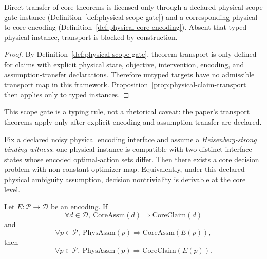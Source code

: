 \begin{proposition}\label{prop:typed-physical-transport-requirement}
Direct transfer of core theorems is licensed only through a declared physical scope gate instance (Definition~\ref{def:physical-scope-gate}) and a corresponding physical-to-core encoding (Definition~\ref{def:physical-core-encoding}). Absent that typed physical instance, transport is blocked by construction.
\end{proposition}

\begin{proof}
By Definition~\ref{def:physical-scope-gate}, theorem transport is only defined for claims with explicit physical state, objective, intervention, encoding, and assumption-transfer declarations. Therefore untyped targets have no admissible transport map in this framework. Proposition~\ref{prop:physical-claim-transport} then applies only to typed instances.
\end{proof}

This scope gate is a typing rule, not a rhetorical caveat: the paper's transport theorems apply only after explicit encoding and assumption transfer are declared.

\begin{proposition}\label{prop:heisenberg-strong-nontrivial-opt}
Fix a declared noisy physical encoding interface and assume a \emph{Heisenberg-strong binding witness}: one physical instance is compatible with two distinct interface states whose encoded optimal-action sets differ.
Then there exists a core decision problem with non-constant optimizer map.
Equivalently, under this declared physical ambiguity assumption, decision nontriviality is derivable at the core level.
\end{proposition}

\begin{proposition}\label{prop:physical-claim-transport}
Let $E:\mathcal{P}\to\mathcal{D}$ be an encoding. If
\[
\forall d\in\mathcal{D},\ \mathrm{CoreAssm}(d)\Rightarrow \mathrm{CoreClaim}(d)
\]
and
\[
\forall p\in\mathcal{P},\ \mathrm{PhysAssm}(p)\Rightarrow \mathrm{CoreAssm}(E(p)),
\]
then
\[
\forall p\in\mathcal{P},\ \mathrm{PhysAssm}(p)\Rightarrow \mathrm{CoreClaim}(E(p)).
\]
\end{proposition}

